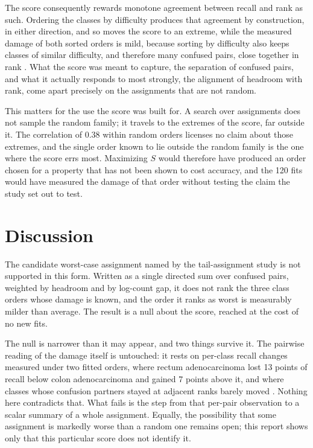 The score consequently rewards monotone agreement between recall and rank as such. Ordering the classes by difficulty produces that agreement by construction, in either direction, and so moves the score to an extreme, while the measured damage of both sorted orders is mild, because sorting by difficulty also keeps classes of similar difficulty, and therefore many confused pairs, close together in rank \citep{queisler2026tailTcga}. What the score was meant to capture, the separation of confused pairs, and what it actually responds to most strongly, the alignment of headroom with rank, come apart precisely on the assignments that are not random.

This matters for the use the score was built for. A search over assignments does not sample the random family; it travels to the extremes of the score, far outside it. The correlation of 0.38 within random orders licenses no claim about those extremes, and the single order known to lie outside the random family is the one where the score errs most. Maximizing $S$ would therefore have produced an order chosen for a property that has not been shown to cost accuracy, and the 120 fits would have measured the damage of that order without testing the claim the study set out to test.

\section{Discussion}
\label{sec:discussion}
The candidate worst-case assignment named by the tail-assignment study \citep{queisler2026tailTcga} is not supported in this form. Written as a single directed sum over confused pairs, weighted by headroom and by log-count gap, it does not rank the three class orders whose damage is known, and the order it ranks as worst is measurably milder than average. The result is a null about the score, reached at the cost of no new fits.

The null is narrower than it may appear, and two things survive it. The pairwise reading of the damage itself is untouched: it rests on per-class recall changes measured under two fitted orders, where rectum adenocarcinoma lost 13 points of recall below colon adenocarcinoma and gained 7 points above it, and where classes whose confusion partners stayed at adjacent ranks barely moved \citep{queisler2026tailTcga}. Nothing here contradicts that. What fails is the step from that per-pair observation to a scalar summary of a whole assignment. Equally, the possibility that some assignment is markedly worse than a random one remains open; this report shows only that this particular score does not identify it.

